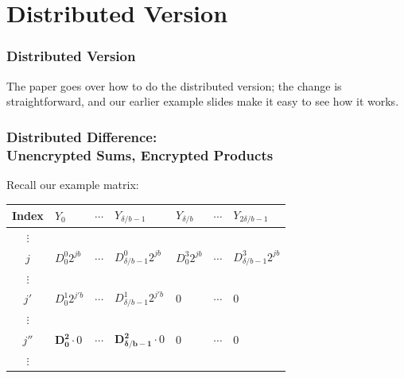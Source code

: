 \documentclass{beamer}
\makeatletter
\DeclareRobustCommand*{\&}{%
  \nfss@text{%
    \fontfamily{LinuxBiolinumT-TLF}%
    \selectfont
    \symbol{`\&}%
  }%
}
\makeatother
\begin{document}
\section{Distributed Version}
\begin{frame}
  \frametitle{Distributed Version}
  The paper goes over how to do the distributed version; the change is
  straightforward, and our earlier example slides make it easy to see how it
  works.
\end{frame}

\begin{frame}
  \frametitle{Distributed Difference:\\ Unencrypted Sums, Encrypted Products}
  Recall our example matrix:
  \begin{center}
  \begin{tabular}{c  C{1.55cm}  c  C{1.55cm}  C{1.55cm}  c  C{1.55cm}  }
     {\scriptsize Index}             & $Y_0$\qquad            & $\cdots$\qquad         & $Y_{\delta/b-1}$\qquad & $Y_{\delta/b}$\qquad   & $\cdots$\qquad         & $Y_{2\delta/b-1}$\qquad\\\toprule
     $\vdots$ & \\
     {\footnotesize$j$} & {\footnotesize ${D^0_0} 2^{jb}$}                         & $\cdots$ & {\footnotesize ${D^0_{\delta/b-1}} 2^{jb}$}                      & {\footnotesize ${D^3_0} 2^{jb}$}                         & $\cdots$ & {\footnotesize ${D^3_{\delta/b-1}} 2^{jb}$}                         \\
     $\vdots$ & \\
     {\footnotesize$j'$}  & {\footnotesize ${D^1_0} 2^{j'b}$} & $\cdots$                           & {\footnotesize ${D^1_{\delta/b-1}} 2^{j'b}$}                           & 0                      & $\cdots$                           & 0\\
     $\vdots$ & \\
     {\footnotesize$j''$}  & {\footnotesize $\bm{D^2_0} \cdot 0$}  & $\cdots$                           & {\footnotesize $\bm{D^2_{\delta/b-1}} \cdot 0$}     & 0                      & $\cdots$                           & 0\\
     $\vdots$ & \\\bottomrule
  \end{tabular}
  \end{center}
\end{frame}
\end{document}
